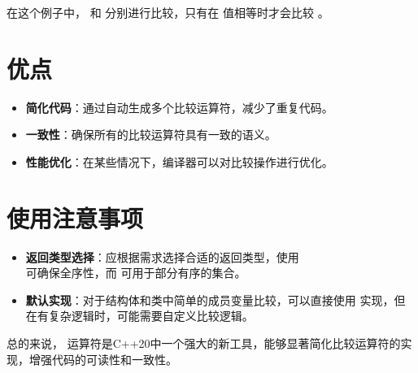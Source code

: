 在这个例子中， 和  分别进行比较，只有在  值相等时才会比较 。

\section{优点}
\begin{itemize}
	\item \textbf{简化代码}：通过自动生成多个比较运算符，减少了重复代码。
	\item \textbf{一致性}：确保所有的比较运算符具有一致的语义。
	\item \textbf{性能优化}：在某些情况下，编译器可以对比较操作进行优化。
\end{itemize}

\section{使用注意事项}
\begin{itemize}
	\item \textbf{返回类型选择}：应根据需求选择合适的返回类型，使用\\ 可确保全序性，而  可用于部分有序的集合。
	\item \textbf{默认实现}：对于结构体和类中简单的成员变量比较，可以直接使用  实现，但在有复杂逻辑时，可能需要自定义比较逻辑。
\end{itemize}

总的来说，\cppinline{<=>} 运算符是C++20中一个强大的新工具，能够显著简化比较运算符的实现，增强代码的可读性和一致性。
